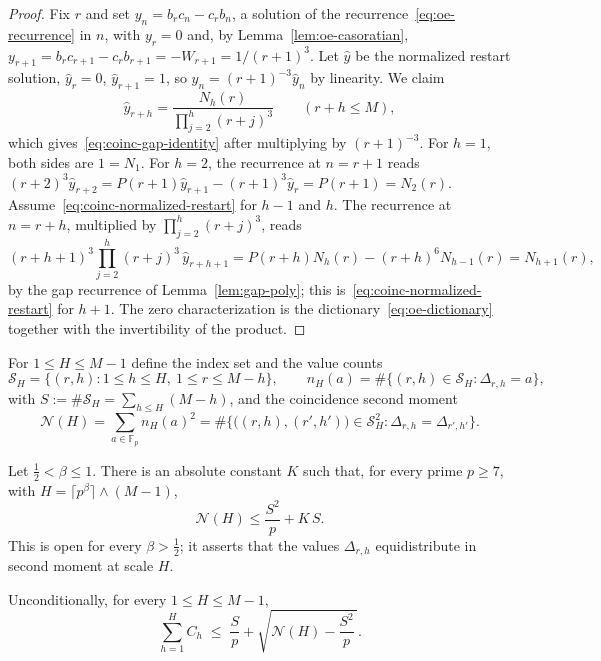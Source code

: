 \begin{proof}
Fix $r$ and set $y_n=b_rc_n-c_rb_n$, a solution of the
recurrence~\eqref{eq:oe-recurrence} in $n$, with $y_r=0$ and, by
Lemma~\ref{lem:oe-casoratian},
$y_{r+1}=b_rc_{r+1}-c_rb_{r+1}=-W_{r+1}=1/(r+1)^3$.
Let $\hat y$ be the normalized restart solution, $\hat y_r=0$,
$\hat y_{r+1}=1$, so $y_n=(r+1)^{-3}\hat y_n$ by linearity.  We claim
\begin{equation}\label{eq:coinc-normalized-restart}
 \hat y_{r+h}=\frac{N_h(r)}{\prod_{j=2}^{h}(r+j)^3}\qquad(r+h\le M),
\end{equation}
which
gives~\eqref{eq:coinc-gap-identity} after multiplying by $(r+1)^{-3}$.
For $h=1$, both sides are $1=N_1$.  For $h=2$, the recurrence at $n=r+1$
reads $(r+2)^3\hat y_{r+2}=P(r+1)\hat y_{r+1}-(r+1)^3\hat y_r=P(r+1)=N_2(r)$.
Assume~\eqref{eq:coinc-normalized-restart} for $h-1$ and $h$.  The
recurrence at $n=r+h$, multiplied by $\prod_{j=2}^{h}(r+j)^3$, reads
\[
 (r+h+1)^3\!\!\prod_{j=2}^{h}(r+j)^3\,\hat y_{r+h+1}
 =P(r+h)N_h(r)-(r+h)^6N_{h-1}(r)
 =N_{h+1}(r),
\]
by the gap recurrence of Lemma~\ref{lem:gap-poly}; this
is~\eqref{eq:coinc-normalized-restart} for $h+1$.  The zero
characterization is the dictionary~\eqref{eq:oe-dictionary} together with
the invertibility of the product.
\end{proof}

For $1\le H\le M-1$ define the index set and the value counts
\[
 \mathcal S_H=\{(r,h):1\le h\le H,\ 1\le r\le M-h\},
 \qquad
 n_H(a)=\#\{(r,h)\in\mathcal S_H:\Delta_{r,h}=a\},
\]
with $S:=\#\mathcal S_H=\sum_{h\le H}(M-h)$, and the coincidence second
moment
\[
 \mathcal N(H)=\sum_{a\in\mathbb F_p}n_H(a)^2
 =\#\{\bigl((r,h),(r',h')\bigr)\in\mathcal S_H^2:
 \Delta_{r,h}=\Delta_{r',h'}\}.
\]

\begin{conjecture}
\label{conj:coinc-beta}
Let $\tfrac12<\beta\le1$.  There is an absolute constant $K$ such that,
for every prime $p\ge7$, with $H=\lceil p^\beta\rceil\wedge(M-1)$,
\begin{equation}\label{eq:coinc-hypothesis}
 \mathcal N(H)\le\frac{S^2}{p}+K\,S .
\end{equation}
This is open for every $\beta>\tfrac12$; it asserts that the values
$\Delta_{r,h}$ equidistribute in second moment at scale $H$.
\end{conjecture}

\begin{lemma}\label{lem:coinc-centered}
Unconditionally, for every $1\le H\le M-1$,
\begin{equation}\label{eq:coinc-centered}
 \sum_{h=1}^{H}C_h\;\le\;\frac Sp+\sqrt{\mathcal N(H)-\frac{S^2}p\,}.
\end{equation}
\end{lemma}

